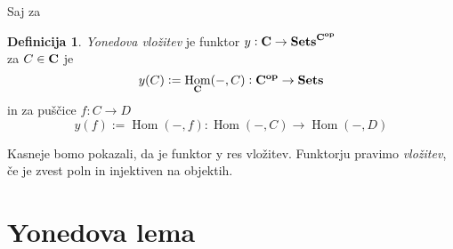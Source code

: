 \documentclass[12pt,a4paper]{book}
\theoremstyle{definition}
\newtheorem{definicija}{Definicija}[chapter]
\theoremstyle{plain}
\theoremstyle{definition}
\theoremstyle{remark}
\DeclareMathOperator{\Hom}{Hom}
\begin{document}
Saj za 

\begin{definicija} {\it Yonedova vložitev} je funktor $y : \bf{C} \to \bf{Sets}^{\bf{C}^{op}}$ \\  za $C \in \bf{C}$ je $$y(C) := \Hom_{\bf{C}}(-, C) : \bf{C}^{op} \to \bf{Sets}$$ in za puščice $f : C \to D$
$$y(f) := \Hom(-,f) : \Hom(-,C) \to \Hom(-,D)$$
\end{definicija}

Kasneje bomo pokazali, da je funktor y res vložitev. Funktorju pravimo {\it vložitev}, če je zvest poln in injektiven na objektih.

\section{Yonedova lema}
\end{document}
